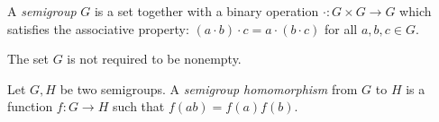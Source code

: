\documentclass[12pt]{article}
\begin{document}
A {\em semigroup} $G$ is a set together with a binary operation $\cdot: G \times G \longrightarrow G$ which satisfies the associative property: $(a \cdot b) \cdot c = a \cdot (b \cdot c)$ for all $a,b,c \in G$.

The set $G$ is not required to be nonempty.

Let $G,H$ be two semigroups.  A \emph{semigroup homomorphism} from $G$ to $H$ is a function $f:G\to H$ such that $f(ab)=f(a)f(b)$.
\end{document}
